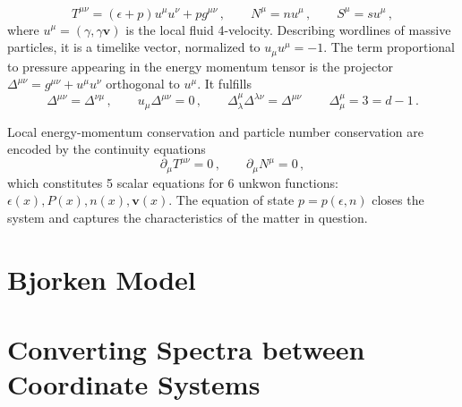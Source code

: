\begin{equation}
        T^{\mu\nu}=(\epsilon+p)u^\mu u^\nu+pg^{\mu\nu}\,,\qquad
        N^\mu       =nu^\mu\,,\qquad
        S^\mu       =su^\mu\,,
    \end{equation}
where $u^\mu=(\gamma,\gamma\mathbf{v})$ is the local fluid 4-velocity. Describing wordlines of massive particles, it is a timelike vector, normalized to ${u_\mu u^\mu=-1}$. The term proportional to pressure appearing in the energy momentum tensor is the projector ${\Delta^{\mu\nu}=g^{\mu\nu}+u^\mu u^\nu}$ orthogonal to $u^\mu$. It fulfills
\begin{equation}
    \Delta^{\mu\nu}=\Delta^{\nu\mu}\,,\qquad u_\mu\Delta^{\mu\nu}=0\,,\qquad\Delta^\mu_\lambda\Delta^{\lambda\nu}=\Delta^{\mu\nu}\,\qquad\Delta^\mu_\mu=3=d-1\,.
    \label{eq:FluidMechanics_ProjProperties}
\end{equation}

Local energy-momentum conservation and particle number conservation are encoded by the continuity equations
    \begin{equation}
        \partial_\mu T^{\mu\nu}  =0\,,\qquad
        \partial_\mu N^\mu       =0\,,
    \end{equation}
which constitutes 5 scalar equations for 6 unkwon functions: $\epsilon(x), P(x), n(x), \mathbf{v}(x)$. The equation of state $p=p(\epsilon,n)$ closes the system and captures the characteristics of the matter in question.



\section{Bjorken Model}









\section{Converting Spectra between Coordinate Systems}
\label{sec:SpectraCoordinateSystem}

